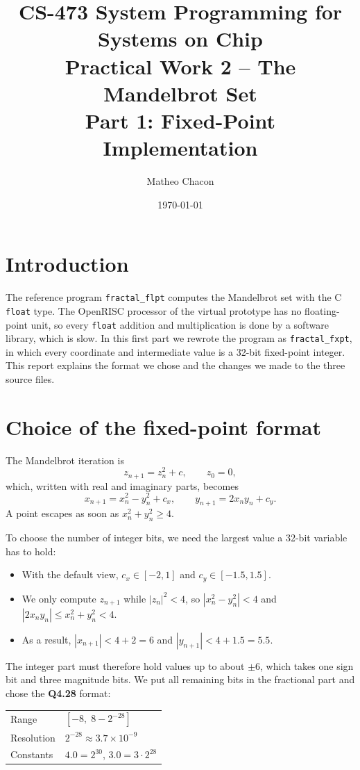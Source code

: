 \documentclass[11pt,a4paper]{article}
\title{CS-473 System Programming for Systems on Chip\\[0.3em]
       \large Practical Work 2 -- The Mandelbrot Set\\
       Part 1: Fixed-Point Implementation}
\author{Matheo Chacon}
\date{\today}
\begin{document}
\maketitle

\section{Introduction}

The reference program \texttt{fractal\_flpt} computes the Mandelbrot set with
the C \texttt{float} type. The OpenRISC processor of the virtual prototype has
no floating-point unit, so every \texttt{float} addition and multiplication is
done by a software library, which is slow. In this first part we rewrote the
program as \texttt{fractal\_fxpt}, in which every coordinate and intermediate
value is a 32-bit fixed-point integer. This report explains the format we
chose and the changes we made to the three source files.

\section{Choice of the fixed-point format}

The Mandelbrot iteration is
\[
  z_{n+1} = z_n^2 + c, \qquad z_0 = 0,
\]
which, written with real and imaginary parts, becomes
\[
  x_{n+1} = x_n^2 - y_n^2 + c_x, \qquad y_{n+1} = 2x_ny_n + c_y .
\]
A point escapes as soon as $x_n^2 + y_n^2 \geq 4$.

To choose the number of integer bits, we need the largest value a 32-bit
variable has to hold:
\begin{itemize}
  \item With the default view, $c_x \in [-2, 1]$ and $c_y \in [-1.5, 1.5]$.
  \item We only compute $z_{n+1}$ while $|z_n|^2 < 4$, so
        $|x_n^2 - y_n^2| < 4$ and $|2x_ny_n| \leq x_n^2 + y_n^2 < 4$.
  \item As a result, $|x_{n+1}| < 4 + 2 = 6$ and $|y_{n+1}| < 4 + 1.5 = 5.5$.
\end{itemize}
The integer part must therefore hold values up to about $\pm 6$, which takes
one sign bit and three magnitude bits. We put all remaining bits in the
fractional part and chose the \textbf{Q4.28} format:

\begin{center}
\begin{tabular}{@{}ll@{}}
  \toprule
  Range      & $[-8,\; 8 - 2^{-28}]$ \\
  Resolution & $2^{-28} \approx 3.7 \times 10^{-9}$ \\
  Constants  & $4.0 = 2^{30}$, \quad $3.0 = 3 \cdot 2^{28}$ \\
  \bottomrule
\end{tabular}
\end{center}
\end{document}
